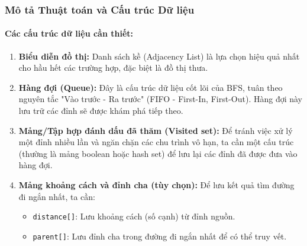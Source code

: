 \documentclass[a4paper,12pt]{article}
\begin{document}
\subsubsection{Mô tả Thuật toán và Cấu trúc Dữ liệu}
\paragraph{Các cấu trúc dữ liệu cần thiết:}
\begin{enumerate}
    \item \textbf{Biểu diễn đồ thị:} Danh sách kề (Adjacency List) là lựa chọn hiệu quả nhất cho hầu hết các trường hợp, đặc biệt là đồ thị thưa.
    \item \textbf{Hàng đợi (Queue):} Đây là cấu trúc dữ liệu cốt lõi của BFS, tuân theo nguyên tắc "Vào trước - Ra trước" (FIFO - First-In, First-Out). Hàng đợi này lưu trữ các đỉnh sẽ được khám phá tiếp theo.
    \item \textbf{Mảng/Tập hợp đánh dấu đã thăm (Visited set):} Để tránh việc xử lý một đỉnh nhiều lần và ngăn chặn các chu trình vô hạn, ta cần một cấu trúc (thường là mảng boolean hoặc hash set) để lưu lại các đỉnh đã được đưa vào hàng đợi.
    \item \textbf{Mảng khoảng cách và đỉnh cha (tùy chọn):} Để lưu kết quả tìm đường đi ngắn nhất, ta cần:
        \begin{itemize}
            \item \texttt{distance[]}: Lưu khoảng cách (số cạnh) từ đỉnh nguồn.
            \item \texttt{parent[]}: Lưu đỉnh cha trong đường đi ngắn nhất để có thể truy vết.
        \end{itemize}
\end{enumerate}
\end{document}

